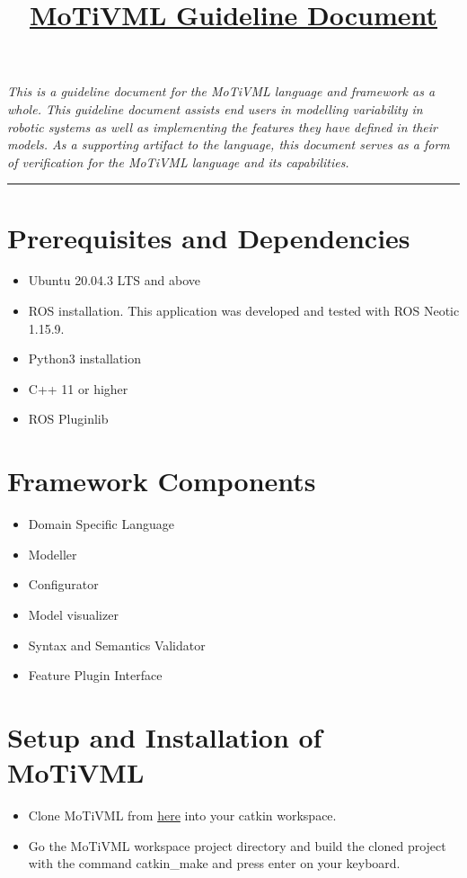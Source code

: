 \documentclass{article}
\title{\underline{\textbf{MoTiVML Guideline Document}}}
\author{}
\date{}
\begin{document}
\maketitle
\textit{This is a guideline document for the MoTiVML language and framework as a whole. This guideline document assists end users in modelling variability in robotic systems as well as implementing the features they have defined in their models. As a supporting artifact to the language,  this document serves as a form of verification for the MoTiVML language and its capabilities.}

\noindent\rule{17cm}{0.4pt}

\label{guide:docs}
\section{Prerequisites and Dependencies}
    \begin{itemize}
        \item Ubuntu 20.04.3 LTS and above
        \item ROS installation. This application was developed and tested with ROS Neotic 1.15.9.
        \item Python3 installation
        \item C++ 11 or higher
        \item ROS Pluginlib
    \end{itemize}

\section{Framework Components}
\begin{itemize}
	\item Domain Specific Language
	\item Modeller
	\item Configurator
	\item Model visualizer
	\item Syntax and Semantics Validator
	\item Feature Plugin Interface
\end{itemize}

\section{Setup and Installation of MoTiVML}
\begin{itemize}
    \item Clone MoTiVML from \href{https://github.com/SergioGarG/sera-extension}{here} into your catkin workspace.
    \item Go the MoTiVML workspace project directory and build the cloned project with the command catkin\_make and press enter on your keyboard.
\end{itemize}
\end{document}
